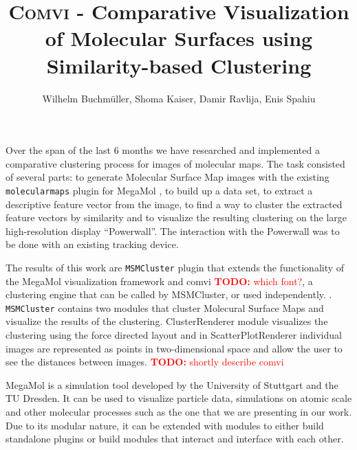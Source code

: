 \documentclass[journal]{vgtc}       %
\title{\textsc{Comvi} - Comparative Visualization of Molecular Surfaces using Similarity-based Clustering}
\author{Wilhelm Buchm\"uller, Shoma Kaiser, Damir Ravlija, Enis Spahiu}
\newcommand{\todo}[1]{\textcolor{red}{\textbf{TODO:} #1}}
\begin{document}

\label{sec:intro}
%
\maketitle
%
Over the span of the last 6 months we  have researched and implemented a comparative clustering  process for images of molecular maps.
The task consisted of several parts: to generate Molecular Surface Map images with the existing \verb|molecularmaps| plugin for MegaMol \cite{MegaMol}, to build up a data set, to extract a descriptive feature vector from the image, to find a way to cluster the extracted  feature vectors by similarity  and to visualize the resulting clustering on the large high-resolution display ``Powerwall''. The interaction with the Powerwall was to be done with  an existing tracking device.

The results of this work are \verb|MSMCluster| plugin that  extends the functionality of the MegaMol\cite{MegaMol} visualization framework and comvi \todo{which font?}, a clustering engine that can be called by MSMCluster, or used independently. . \verb|MSMCluster| contains two modules that cluster Molecural Surface Maps and visualize the results of the clustering. ClusterRenderer module visualizes the clustering using the force directed layout and in ScatterPlotRenderer individual images are represented as points in two-dimensional space and allow the user to see the distances between images. \todo{shortly describe comvi}

MegaMol is a simulation tool developed by the University of Stuttgart and the TU Dresden. It can be used to visualize particle data, simulations on atomic scale and other molecular processes such as the one that we are presenting in our work. 
Due to its modular nature, it can be extended with modules to either build standalone plugins or build modules that interact and interface with each other.
\end{document}
